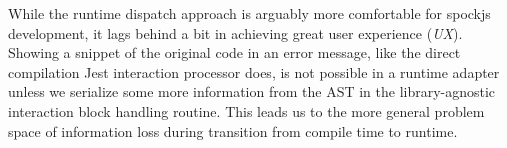 While the runtime dispatch approach is arguably
more comfortable for spockjs development,
it lags behind a bit in
achieving great user experience (\textit{UX}).
Showing a snippet of the original code in an error message,
like the direct compilation Jest interaction processor does,
is not possible in a runtime adapter
unless we serialize some more information from the AST
in the library-agnostic interaction block handling routine.
This leads us to the more general problem space
of information loss during transition from compile time to runtime.
